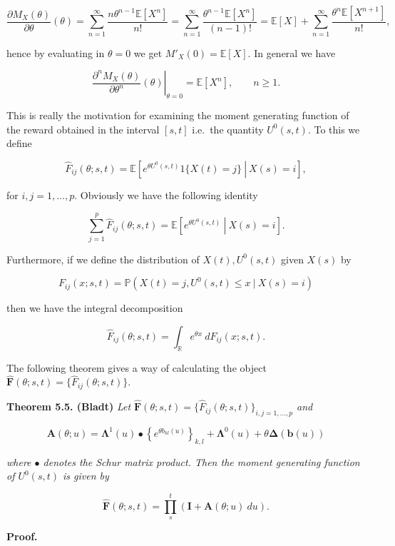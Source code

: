 \documentclass[
]{book}
\begin{document}
\[
\frac{\partial M_X(\theta)}{\partial \theta}(\theta)=\sum_{n=1}^\infty\frac{n\theta^{n-1} \mathbb E[X^n]}{n!}=\sum_{n=1}^\infty\frac{\theta^{n-1} \mathbb E[X^n]}{(n-1)!}=\mathbb E[X]+\sum_{n=1}^\infty\frac{\theta^{n} \mathbb E[X^{n+1}]}{n!},
\]

hence by evaluating in \(\theta = 0\) we get \(M'_X(0)=\mathbb E[X]\). In general we have

\[
\left.\frac{\partial^n M_X(\theta)}{\partial \theta^n}(\theta)\right\vert_{\theta = 0}=\mathbb E[X^n],\qquad n\ge 1.
\]

This is really the motivation for examining the moment generating function of the reward obtained in the interval \([s,t]\) i.e.~the quantity \(U^0(s,t)\). To this we define

\[
\hat F_{ij}(\theta;s,t)=\mathbb E\left[\left.e^{\theta U^0(s,t)}1\{X(t)=j\}\ \right\vert\ X(s)=i\right],
\]

for \(i,j=1,...,p\). Obviously we have the following identity

\[
\sum_{j=1}^p\hat F_{ij}(\theta;s,t)=\mathbb E\left[\left.e^{\theta U^0(s,t)}\ \right\vert\ X(s)=i\right].
\]

Furthermore, if we define the distribution of \(X(t),U^0(s,t)\) given \(X(s)\) by

\[
F_{ij}(x; s,t)=\mathbb P(X(t)=j,U^0(s,t)\le x\ \vert\ X(s)=i)
\]

then we have the integral decomposition

\[
\hat F_{ij}(\theta; s,t)=\int_{\mathbb R} e^{\theta x}\ dF_{ij}(x; s,t).
\]

The following theorem gives a way of calculating the object \(\hat{\mathbf F}(\theta; s,t)=\{\hat F_{ij}(\theta; s,t)\}\).

\textbf{Theorem 5.5. (Bladt)} \emph{Let \(\hat{\mathbf F}(\theta; s,t)=\{\hat F_{ij}(\theta; s,t)\}_{i,j=1,...,p}\) and}

\[
\mathbf A(\theta;u)=\mathbf\Lambda^1(u)\bullet\left\{e^{\theta b_{kl}(u)}\right\}_{k,l}+\mathbf \Lambda^0(u)+\theta \mathbf \Delta(\mathbf b(u))
\]

\emph{where \(\bullet\) denotes the Schur matrix product. Then the moment generating function of \(U^0(s,t)\) is given by}

\[
\hat{\mathbf F}(\theta; s,t)=\prod_s^t(\mathbf I + \mathbf A(\theta; u)\ du).
\]

\textbf{Proof.}
\end{document}
